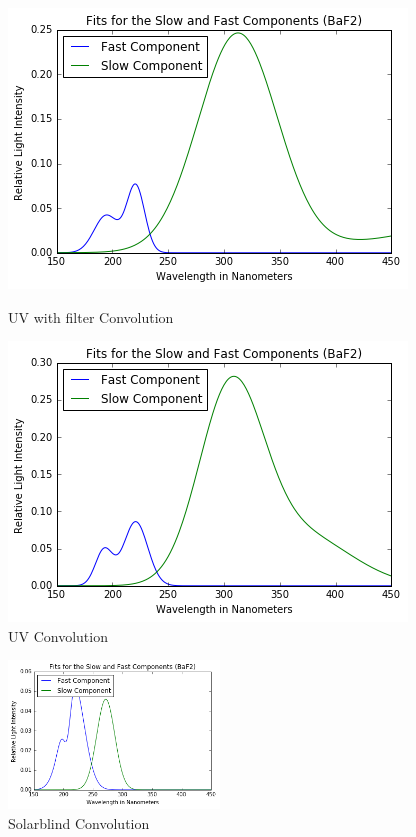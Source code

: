 \documentclass{article}
\begin{document}
\begin{figure}[H]
  \centering
  \begin{minipage}[b]{0.4\textwidth}
    \includegraphics[width=\textwidth]{convf.png}
    \caption{UV with filter Convolution}
  \end{minipage}
  \hfill
  \begin{minipage}[b]{0.4\textwidth}
    \includegraphics[width=\textwidth]{convuv.png}
    \caption{UV Convolution}
  \end{minipage}
\end{figure}

\begin{figure}
  \centering
    \includegraphics[width=0.5\textwidth]{convsb.png}
  \caption{Solarblind Convolution}
  \label{fig:workflowedge}
\end{figure}
\end{document}
